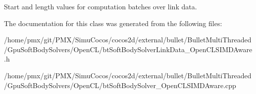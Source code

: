 Start and length values for computation batches over link data. 

The documentation for this class was generated from the following files\+:\begin{DoxyCompactItemize}
\item 
/home/pmx/git/\+P\+M\+X/\+Simu\+Cocos/cocos2d/external/bullet/\+Bullet\+Multi\+Threaded/\+Gpu\+Soft\+Body\+Solvers/\+Open\+C\+L/bt\+Soft\+Body\+Solver\+Link\+Data\+\_\+\+Open\+C\+L\+S\+I\+M\+D\+Aware.\+h\item 
/home/pmx/git/\+P\+M\+X/\+Simu\+Cocos/cocos2d/external/bullet/\+Bullet\+Multi\+Threaded/\+Gpu\+Soft\+Body\+Solvers/\+Open\+C\+L/bt\+Soft\+Body\+Solver\+\_\+\+Open\+C\+L\+S\+I\+M\+D\+Aware.\+cpp\end{DoxyCompactItemize}
